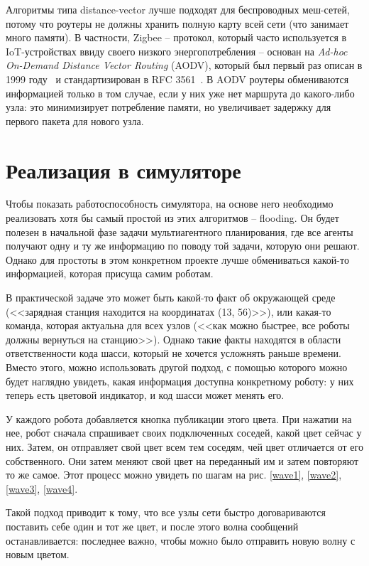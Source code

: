 \documentclass[%
]{report}
\begin{document}
Алгоритмы типа distance-vector лучше подходят для беспроводных меш-сетей,
потому что роутеры не должны хранить полную карту всей сети (что занимает много памяти).
В частности, Zigbee -- протокол, который часто используется в IoT-устройствах ввиду своего низкого
энергопотребления --
основан на \emph{Ad-hoc On-Demand Distance Vector Routing} (AODV),
который был первый раз описан в 1999 году~\cite{perkins1999aodv}
и стандартизирован в RFC 3561~\cite{rfc3561}.
В AODV роутеры обмениваются информацией только в том случае,
если у них уже нет маршрута до какого-либо узла:
это минимизирует потребление памяти,
но увеличивает задержку для первого пакета для нового узла.

\section{Реализация в симуляторе}

Чтобы показать работоспособность симулятора,
на основе него необходимо реализовать хотя бы самый простой из этих алгоритмов -- flooding.
Он будет полезен в начальной фазе задачи мультиагентного планирования,
где все агенты получают одну и ту же информацию
по поводу той задачи, которую они решают.
Однако для простоты в этом конкретном проекте лучше обмениваться какой-то информацией,
которая присуща самим роботам.

В практической задаче это может быть какой-то факт об окружающей среде
(<<зарядная станция находится на координатах (13, 56)>>),
или какая-то команда, которая актуальна для всех узлов
(<<как можно быстрее, все роботы должны вернуться на станцию>>).
Однако такие факты находятся в области ответственности кода шасси,
который не хочется усложнять раньше времени.
Вместо этого, можно использовать другой подход,
с помощью которого можно будет наглядно увидеть, какая информация доступна конкретному роботу:
у них теперь есть цветовой индикатор,
и код шасси может менять его.

У каждого робота добавляется кнопка публикации этого цвета.
При нажатии на нее, робот сначала спрашивает своих подключенных соседей,
какой цвет сейчас у них.
Затем, он отправляет свой цвет всем тем соседям,
чей цвет отличается от его собственного.
Они затем меняют свой цвет на переданный им
и затем повторяют то же самое.
Этот процесс можно увидеть по шагам на рис. \ref{wave1}, \ref{wave2}, \ref{wave3}, \ref{wave4}.

Такой подход приводит к тому,
что все узлы сети быстро договариваются поставить себе один и тот же цвет,
и после этого волна сообщений останавливается:
последнее важно, чтобы можно было отправить новую волну с новым цветом.
\end{document}
